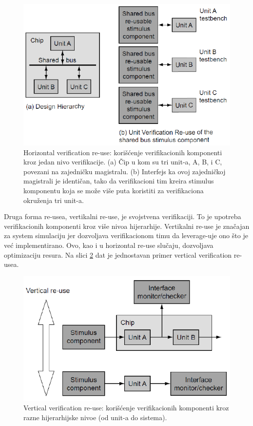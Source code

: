 \documentclass[a4paper, 12pt]{article}
\begin{document}
\begin{figure}[h!]
\centering
\includegraphics[scale=0.5]{img7.png}
\caption{Horizontal verification re-use: korišćenje verifikacionih komponenti kroz jedan nivo verifikacije. (a) Čip u kom su tri unit-a, A, B, i C, povezani na zajedničku magistralu. (b) Interfejs ka ovoj zajedničkoj magistrali je identičan, tako da verifikacioni tim kreira stimulus komponentu koja se može više puta koristiti za verifikaciona okruženja tri unit-a.}
\label{img7}
\end{figure}
\indent Druga forma re-usea, vertikalni re-use, je svojstvena verifikaciji. To je upotreba verifikacionih komponenti kroz više nivoa hijerarhije. Vertikalni re-use je značajan za system simulaciju jer dozvoljava verifikacionom timu da leverage-uje ono što je već implementirano. Ovo, kao i u horizontal re-use slučaju, dozvoljava optimizaciju resura. Na slici \ref{img8} dat je jednostavan primer vertical verification re-usea.
\begin{figure}[h!]
\centering
\includegraphics[scale=0.5]{img8.png}
\caption{Vertical verification re-use: korišćenje verifikacionih komponenti kroz razne hijerarhijske nivoe (od unit-a do sistema).}
\label{img8}
\end{figure}
\end{document}
